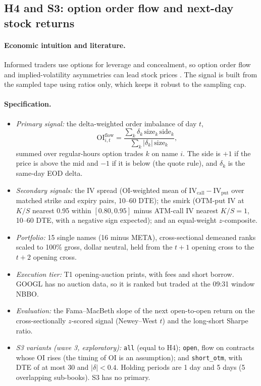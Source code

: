 \documentclass[../main.tex]{subfiles}
\begin{document}
\subsection{H4 and S3: option order flow and next-day stock returns}\label{sec:h4}

\paragraph{Economic intuition and literature.}
Informed traders use options for leverage and concealment, so option order flow and implied-volatility asymmetries can lead stock prices \citep{easley1998,pan2006,cremers2010,xing2010,johnsonso2012}. The signal is built from the sampled tape using ratios only, which keeps it robust to the sampling cap.

\paragraph{Specification.}
\begin{itemize}
\item \emph{Primary signal:} the delta-weighted order imbalance of day $t$,
\begin{equation}
\mathrm{OI}^{\mathrm{flow}}_{i,t} = \frac{\sum_k \delta_k \, \mathrm{size}_k \, \mathrm{side}_k}{\sum_k |\delta_k| \, \mathrm{size}_k}, \label{eq:flow}
\end{equation}
summed over regular-hours option trades $k$ on name $i$. The side is $+1$ if the price is above the mid and $-1$ if it is below (the quote rule), and $\delta_k$ is the same-day EOD delta.
\item \emph{Secondary signals:} the IV spread (OI-weighted mean of $\mathrm{IV}_{\mathrm{call}} - \mathrm{IV}_{\mathrm{put}}$ over matched strike and expiry pairs, 10--60 DTE); the smirk (OTM-put IV at $K/S$ nearest 0.95 within $[0.80, 0.95]$ minus ATM-call IV nearest $K/S = 1$, 10--60 DTE, with a negative sign expected); and an equal-weight $z$-composite.
\item \emph{Portfolio:} 15 single names (16 minus META), cross-sectional demeaned ranks scaled to 100\% gross, dollar neutral, held from the $t+1$ opening cross to the $t+2$ opening cross.
\item \emph{Execution tier:} T1 opening-auction prints, with fees and short borrow. GOOGL has no auction data, so it is ranked but traded at the 09:31 window NBBO.
\item \emph{Evaluation:} the Fama--MacBeth slope of the next open-to-open return on the cross-sectionally $z$-scored signal (Newey--West $t$) and the long-short Sharpe ratio.
\item \emph{S3 variants (wave 3, exploratory):} \texttt{all} (equal to H4); \texttt{open}, flow on contracts whose OI rises (the timing of OI is an assumption); and \texttt{short\_otm}, with DTE of at most 30 and $|\delta| < 0.4$. Holding periods are 1 day and 5 days (5 overlapping sub-books). S3 has no primary.
\end{itemize}
\end{document}
